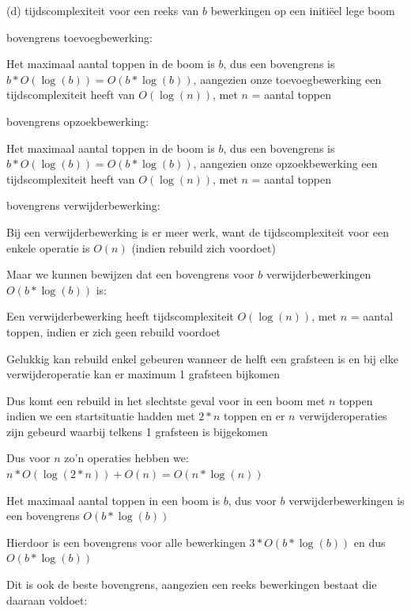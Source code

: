 \documentclass{article}
\begin{document}
\vspace{0.5cm}

\Large (d) tijdscomplexiteit voor een reeks van $b$ bewerkingen op een initiëel lege boom
\vspace{0.3cm}

\large
bovengrens toevoegbewerking:

Het maximaal aantal toppen in de boom is $b$, dus een bovengrens is $b * O(\log(b)) = O(b * \log (b))$, aangezien onze toevoegbewerking een tijdscomplexiteit heeft van $O(\log(n))$, met $n$ = aantal toppen

\vspace{0.2cm}

bovengrens opzoekbewerking:

Het maximaal aantal toppen in de boom is $b$, dus een bovengrens is $b * O(\log(b)) = O(b * \log (b))$, aangezien onze opzoekbewerking een tijdscomplexiteit heeft van $O(\log(n))$, met $n$ = aantal toppen

\vspace{0.2cm}

bovengrens verwijderbewerking:

Bij een verwijderbewerking is er meer werk, want de tijdscomplexiteit voor een enkele operatie is $O(n)$ (indien rebuild zich voordoet)

Maar we kunnen bewijzen dat een bovengrens voor $b$ verwijderbewerkingen $O(b * \log(b))$ is:

Een verwijderbewerking heeft tijdscomplexiteit $O(\log(n))$, met $n$ = aantal toppen, indien er zich geen rebuild voordoet

Gelukkig kan rebuild enkel gebeuren wanneer de helft een grafsteen is en bij elke verwijderoperatie kan er maximum 1 grafsteen bijkomen

Dus komt een rebuild in het slechtste geval voor in een boom met $n$ toppen indien we een startsituatie hadden met $2*n$ toppen en er $n$ verwijderoperaties zijn gebeurd waarbij telkens 1 grafsteen is bijgekomen

Dus voor $n$ zo'n operaties hebben we: $n * O(\log (2*n)) + O(n) = O(n * \log(n))$

Het maximaal aantal toppen in een boom is $b$, dus voor $b$ verwijderbewerkingen is een bovengrens $O(b * \log (b))$
\vspace{0.2cm}

Hierdoor is een bovengrens voor alle bewerkingen $3 * O(b * \log (b))$ en dus $O(b * \log (b))$

Dit is ook de beste bovengrens, aangezien een reeks bewerkingen bestaat die daaraan voldoet: 
\end{document}
